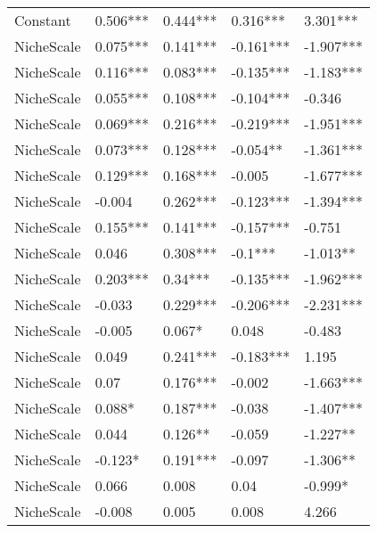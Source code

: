 \begin{longtable}[h!]{lllll}
\bottomrule
\endlastfoot
Constant         &            0.506*** &    0.444*** &   0.316*** &   3.301*** \\
NicheScale       &            0.075*** &    0.141*** &  -0.161*** &  -1.907*** \\
NicheScale       &            0.116*** &    0.083*** &  -0.135*** &  -1.183*** \\
NicheScale       &            0.055*** &    0.108*** &  -0.104*** &     -0.346 \\
NicheScale       &            0.069*** &    0.216*** &  -0.219*** &  -1.951*** \\
NicheScale       &            0.073*** &    0.128*** &   -0.054** &  -1.361*** \\
NicheScale       &            0.129*** &    0.168*** &     -0.005 &  -1.677*** \\
NicheScale       &              -0.004 &    0.262*** &  -0.123*** &  -1.394*** \\
NicheScale       &            0.155*** &    0.141*** &  -0.157*** &     -0.751 \\
NicheScale       &               0.046 &    0.308*** &    -0.1*** &   -1.013** \\
NicheScale       &            0.203*** &     0.34*** &  -0.135*** &  -1.962*** \\
NicheScale       &              -0.033 &    0.229*** &  -0.206*** &  -2.231*** \\
NicheScale       &              -0.005 &      0.067* &      0.048 &     -0.483 \\
NicheScale       &               0.049 &    0.241*** &  -0.183*** &      1.195 \\
NicheScale       &                0.07 &    0.176*** &     -0.002 &  -1.663*** \\
NicheScale       &              0.088* &    0.187*** &     -0.038 &  -1.407*** \\
NicheScale       &               0.044 &     0.126** &     -0.059 &   -1.227** \\
NicheScale       &             -0.123* &    0.191*** &     -0.097 &   -1.306** \\
NicheScale       &               0.066 &       0.008 &       0.04 &    -0.999* \\
NicheScale       &              -0.008 &       0.005 &      0.008 &      4.266 \\
\end{longtable}

